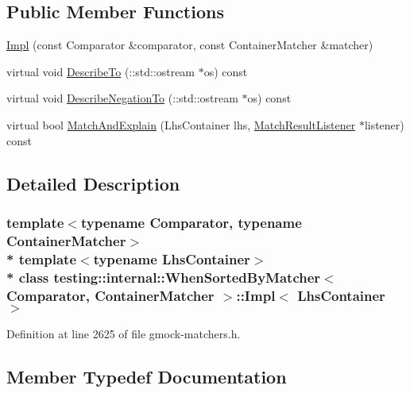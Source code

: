 \subsection*{Public Member Functions}
\begin{DoxyCompactItemize}
\item 
\hyperlink{classtesting_1_1internal_1_1_when_sorted_by_matcher_1_1_impl_a63235e98dec5478b7ff9d06f6babc716}{Impl} (const Comparator \&comparator, const Container\+Matcher \&matcher)
\item 
virtual void \hyperlink{classtesting_1_1internal_1_1_when_sorted_by_matcher_1_1_impl_a1550eab3f77ff48b54d7a0d33a9d8f31}{Describe\+To} (\+::std\+::ostream $\ast$os) const 
\item 
virtual void \hyperlink{classtesting_1_1internal_1_1_when_sorted_by_matcher_1_1_impl_af484d525e5dc6c3ba48c57f0c3696b54}{Describe\+Negation\+To} (\+::std\+::ostream $\ast$os) const 
\item 
virtual bool \hyperlink{classtesting_1_1internal_1_1_when_sorted_by_matcher_1_1_impl_af63d23e035f9938be00fb3bb56977ee6}{Match\+And\+Explain} (Lhs\+Container lhs, \hyperlink{classtesting_1_1_match_result_listener}{Match\+Result\+Listener} $\ast$listener) const 
\end{DoxyCompactItemize}


\subsection{Detailed Description}
\subsubsection*{template$<$typename Comparator, typename Container\+Matcher$>$\\*
template$<$typename Lhs\+Container$>$\\*
class testing\+::internal\+::\+When\+Sorted\+By\+Matcher$<$ Comparator, Container\+Matcher $>$\+::\+Impl$<$ Lhs\+Container $>$}



Definition at line 2625 of file gmock-\/matchers.\+h.



\subsection{Member Typedef Documentation}
